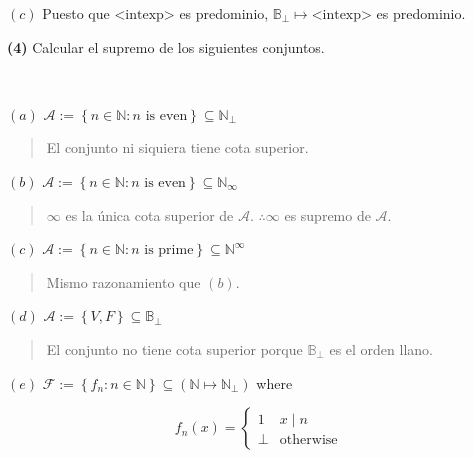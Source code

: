 \documentclass[article, 12pt]{article}
\begin{document}
$(c)$ Puesto que $\text{<intexp>}$ es predominio,
$\mathbb{B}_\bot \mapsto \text{<intexp>}$ es predominio.


\pagebreak 

\begin{myframe}
\textbf{(4)} Calcular el supremo de los siguientes conjuntos.
\end{myframe}

~ 

$(a)$ $\mathcal{A} := \left\{ n \in \mathbb{N} : n \text{ is even} \right\}
\subseteq \mathbb{N}_{\bot} $


\small
\begin{quote}

  El conjunto ni siquiera tiene cota superior. 

\end{quote}
\normalsize

$(b)$ $\mathcal{A} := \left\{ n \in \mathbb{N} : n \text{ is even} \right\}
\subseteq \mathbb{N}_{\infty} $


\small
\begin{quote}

$\infty $ es la única cota superior de $\mathcal{A}$. $\therefore \infty$ es
supremo de $\mathcal{A}$.

\end{quote}
\normalsize


$(c)$ $\mathcal{A} := \left\{ n \in \mathbb{N} : n \text{ is prime} \right\}
\subseteq \mathbb{N}^\infty$


\small
\begin{quote}

Mismo razonamiento que $(b)$.

\end{quote}
\normalsize


$(d)$ $\mathcal{A} := \left\{ V, F \right\} \subseteq \mathbb{B}_\bot$


\small
\begin{quote}

El conjunto no tiene cota superior porque $\mathbb{B}_\bot $ es el orden llano.

\end{quote}
\normalsize


$(e)$ $\mathcal{F} := \left\{ f_n : n \in \mathbb{N} \right\} \subseteq
\left( \mathbb{N} \mapsto \mathbb{N}_\bot  \right) $ where 

\begin{equation*}
  f_n(x) = \begin{cases}
    1 & x \mid n \\ 
    \bot & \text{otherwise}
  \end{cases}
\end{equation*}
\end{document}
